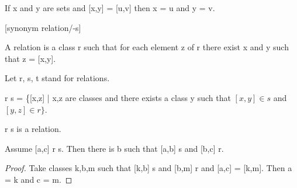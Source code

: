 \documentclass[a4paper,draft]{amsproc}
\begin{document}
\begin{forthel}
\begin{theorem}[55]
If x and y are sets and [x,y] = [u,v] then
x = u and y = v.
\end{theorem}


[synonym relation/-s]

\begin{definition}[56] 
A relation is a class r such that for each element z of r there exist x and y such that z = [x,y].
\end{definition}

Let r, s, t stand for relations.


\begin{definition}[57]
r \circ s = \{[x,z] | x,z are classes and there exists a class y such that 
	$[x,y] \in s$ and $[y,z] \in r\}$. 
\end{definition}

\begin{lemma}
r \circ s is a relation.
\end{lemma}

\begin{lemma}
Assume [a,c] \in r \circ s. Then there is b such that [a,b] \in s and [b,c] \in r.
\end{lemma}
\begin{proof}
Take classes k,b,m such that [k,b] \in s and [b,m] \in r and [a,c] = [k,m].
Then a = k and c = m.
\end{proof}


\end{forthel}
\end{document}

